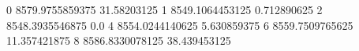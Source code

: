 0 8579.9755859375 31.58203125
1 8549.1064453125 0.712890625
2 8548.3935546875 0.0
4 8554.0244140625 5.630859375
6 8559.7509765625 11.357421875
8 8586.8330078125 38.439453125

